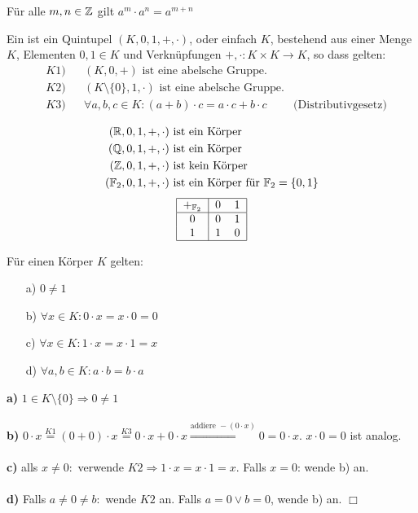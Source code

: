 \begin{ub}
	Für alle $m,n\in\mathbb{Z}$ gilt $a^{m}\cdot a^{n}=a^{m+n}$
\end{ub}

\begin{defi}
	Ein  ist ein Quintupel $(K,0,1,+,\cdot)$, oder einfach $K$, bestehend aus einer Menge $K$, Elementen $0,1\in K$ und Verknüpfungen $+,\cdot:K\times K\rightarrow K$, so dass gelten:
	\begin{align*}
	& K1) && (K,0,+)\text{ ist eine abelsche Gruppe.} \\
	& K2) && (K\setminus\{0\},1,\cdot)\text{ ist eine abelsche Gruppe.}\\
	& K3) && \forall a,b,c\in K:(a+b)\cdot c=a\cdot c+b\cdot c & \text{(Distributivgesetz)}
	\end{align*}
\end{defi}

\begin{bsp}
	\begin{align*}
	(\mathbb{R},0,1,+,\cdot) &\text{ ist ein Körper} \\
	(\mathbb{Q},0,1,+,\cdot) &\text{ ist ein Körper} \\
	(\mathbb{Z},0,1,+,\cdot) &\text{ ist kein Körper} \\
	(\mathbb{F}_{2},0,1,+,\cdot) &\text{ ist ein Körper für }\mathbb{F}_{2}=\{0,1\}
	\end{align*}
	\[
	\begin{tabular}{|c|cc|}
	\hline
	$+_{\mathbb{F}_{2}}$ & 0 & 1 \\
	\hline
	0 & 0 & 1\\
	1 & 1 & 0\\
	\hline
	\end{tabular}
	\]
\end{bsp}

\begin{lem}
	Für einen Körper $K$ gelten:
	\begin{itemize}
		\item[a)] $0\neq 1$
		\item[b)] $\forall x\in K: 0\cdot x=x\cdot 0=0$
		\item[c)] $\forall x\in K: 1\cdot x=x\cdot1=x$
		\item[d)] $\forall a,b\in K: a\cdot b=b\cdot a$\
	\end{itemize}
\end{lem}

\begin{bew}
	\textbf{a)} $1\in K\setminus\{0\}\Rightarrow 0\neq 1$\\
	\\
	\textbf{b)} $0\cdot x\stackrel{K1}{=}(0+0)\cdot x\stackrel{K3}{=}0\cdot x+0\cdot x\stackrel{\text{addiere }-(0\cdot x)}{\Rightarrow} 0=0\cdot x$. $x\cdot 0=0$ ist analog.\\
	\\
	\textbf{c)} alls $x\neq0:$ verwende $K2\Rightarrow1\cdot x=x\cdot1=x$. Falls $x=0$: wende b) an.\\
	\\
	\textbf{d)} Falls $a\neq0\neq b:$ wende $K2$ an. Falls $a=0\vee b=0$, wende b) an. \hfill $\Box$
\end{bew}

